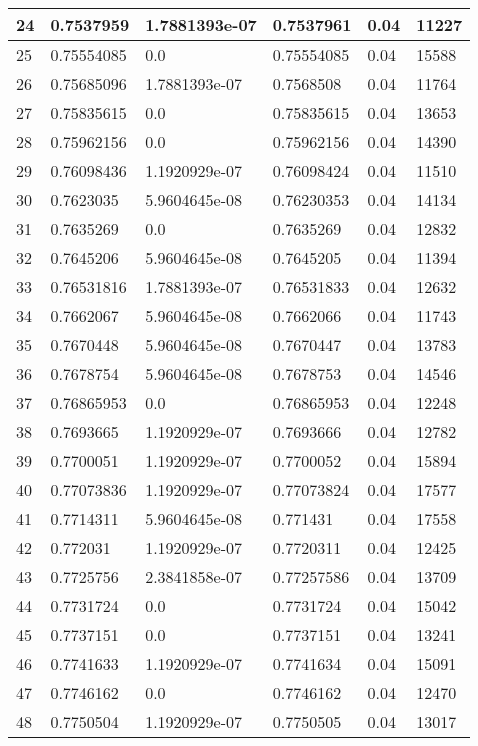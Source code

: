 \begin{longtable}{|l|l|l|l|l|l|}
24 & 0.7537959 & 1.7881393e-07 & 0.7537961 & 0.04 & 11227 \\ \hline 
25 & 0.75554085 & 0.0 & 0.75554085 & 0.04 & 15588 \\ \hline 
26 & 0.75685096 & 1.7881393e-07 & 0.7568508 & 0.04 & 11764 \\ \hline 
27 & 0.75835615 & 0.0 & 0.75835615 & 0.04 & 13653 \\ \hline 
28 & 0.75962156 & 0.0 & 0.75962156 & 0.04 & 14390 \\ \hline 
29 & 0.76098436 & 1.1920929e-07 & 0.76098424 & 0.04 & 11510 \\ \hline 
30 & 0.7623035 & 5.9604645e-08 & 0.76230353 & 0.04 & 14134 \\ \hline 
31 & 0.7635269 & 0.0 & 0.7635269 & 0.04 & 12832 \\ \hline 
32 & 0.7645206 & 5.9604645e-08 & 0.7645205 & 0.04 & 11394 \\ \hline 
33 & 0.76531816 & 1.7881393e-07 & 0.76531833 & 0.04 & 12632 \\ \hline 
34 & 0.7662067 & 5.9604645e-08 & 0.7662066 & 0.04 & 11743 \\ \hline 
35 & 0.7670448 & 5.9604645e-08 & 0.7670447 & 0.04 & 13783 \\ \hline 
36 & 0.7678754 & 5.9604645e-08 & 0.7678753 & 0.04 & 14546 \\ \hline 
37 & 0.76865953 & 0.0 & 0.76865953 & 0.04 & 12248 \\ \hline 
38 & 0.7693665 & 1.1920929e-07 & 0.7693666 & 0.04 & 12782 \\ \hline 
39 & 0.7700051 & 1.1920929e-07 & 0.7700052 & 0.04 & 15894 \\ \hline 
40 & 0.77073836 & 1.1920929e-07 & 0.77073824 & 0.04 & 17577 \\ \hline 
41 & 0.7714311 & 5.9604645e-08 & 0.771431 & 0.04 & 17558 \\ \hline 
42 & 0.772031 & 1.1920929e-07 & 0.7720311 & 0.04 & 12425 \\ \hline 
43 & 0.7725756 & 2.3841858e-07 & 0.77257586 & 0.04 & 13709 \\ \hline 
44 & 0.7731724 & 0.0 & 0.7731724 & 0.04 & 15042 \\ \hline 
45 & 0.7737151 & 0.0 & 0.7737151 & 0.04 & 13241 \\ \hline 
46 & 0.7741633 & 1.1920929e-07 & 0.7741634 & 0.04 & 15091 \\ \hline 
47 & 0.7746162 & 0.0 & 0.7746162 & 0.04 & 12470 \\ \hline 
48 & 0.7750504 & 1.1920929e-07 & 0.7750505 & 0.04 & 13017 \\ \hline 

\end{longtable}
